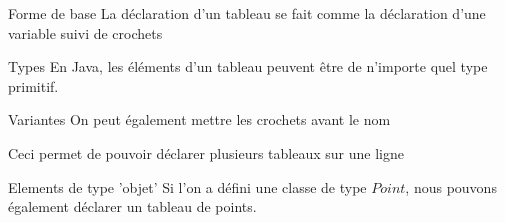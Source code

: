 \begin{frame}{Forme de base}
    La déclaration d'un tableau se fait comme la déclaration d'une variable suivi de crochets
    

    \begin{exampleblock}{Types}
        En Java, les éléments d'un tableau peuvent être de n'importe quel type primitif.
    \end{exampleblock}

    

\end{frame}

\begin{frame}{Variantes}
    On peut également mettre les crochets avant le nom
    
    Ceci permet de pouvoir déclarer plusieurs tableaux sur une ligne
    
\end{frame}

\begin{frame}{Elements de type 'objet'}
    Si l'on a défini une classe de type $Point$, nous pouvons également déclarer un tableau de points.

    
\end{frame}